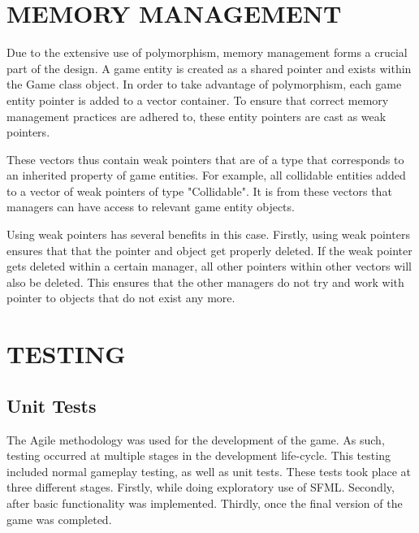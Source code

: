 \documentclass[10pt,twocolumn]{witseiepaper}
\begin{document}


%

%
\section{MEMORY MANAGEMENT} %

Due to the extensive use of polymorphism, memory management forms a crucial part of the design. A game entity is created as a shared pointer and exists within the Game class object. In order to take advantage of polymorphism, each game entity pointer is added to a vector container. To ensure that correct memory management practices are adhered to, these entity pointers are cast as weak pointers. 

These vectors thus contain weak pointers that are of a type that corresponds to an inherited property of game entities. For example, all collidable entities added to a vector of weak pointers of type "Collidable". It is from these vectors that managers can have access to relevant game entity objects.

Using weak pointers has several benefits in this case. Firstly, using weak pointers ensures that that the pointer and object get properly deleted. If the weak pointer gets deleted within a certain manager, all other pointers within other vectors will also be deleted. This ensures that the other managers do not try and work with pointer to objects that do not exist any more.




%
\section{TESTING} %

\subsection{Unit Tests}
The Agile methodology was used for the development of the game. As such, testing occurred at multiple stages in the development life-cycle. This testing included normal gameplay testing, as well as unit tests. These tests took place at three different stages. Firstly, while doing exploratory use of SFML. Secondly, after basic functionality was implemented. Thirdly, once the final version of the game was completed.
\end{document}
